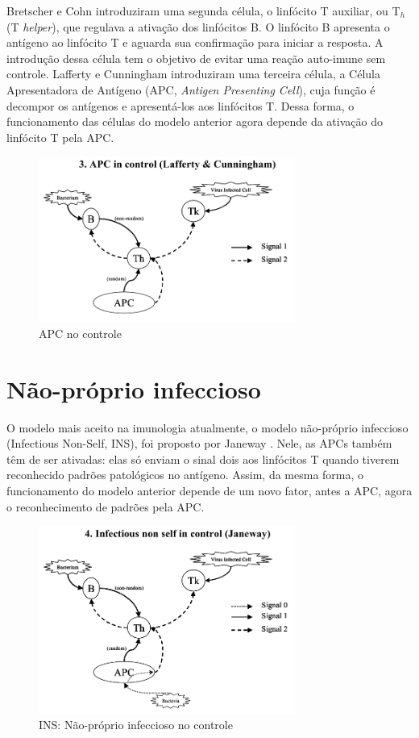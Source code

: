 Bretscher e Cohn introduziram uma segunda célula, o linfócito T auxiliar, ou T$_{h}$ (T \emph{helper}), que regulava a ativação dos linfócitos B. O linfócito B apresenta o antígeno ao linfócito T e aguarda sua confirmação para iniciar a resposta. A introdução dessa célula tem o objetivo de evitar uma reação auto-imune sem controle. Lafferty e Cunningham introduziram uma terceira célula, a Célula Apresentadora de Antígeno (APC, \emph{Antigen Presenting Cell}), cuja função é decompor os antígenos e apresentá-los aos linfócitos T. Dessa forma, o funcionamento das células do modelo anterior agora depende da ativação do linfócito T pela APC.

\begin{figure}[h!]
\centering
\includegraphics[width=0.75\textwidth]{img/signals3-apc.png}
\caption{APC no controle}
\end{figure}

\section{Não-próprio infeccioso}

O modelo mais aceito na imunologia atualmente, o modelo não-próprio infeccioso (Infectious Non-Self, INS), foi proposto por Janeway \cite{Janeway1989}. Nele, as APCs também têm de ser ativadas: elas só enviam o sinal dois aos linfócitos T quando tiverem reconhecido padrões patológicos no antígeno. Assim, da mesma forma, o funcionamento do modelo anterior depende de um novo fator, antes a APC, agora o reconhecimento de padrões pela APC.

\begin{figure}[h!]
\centering
\includegraphics[width=0.75\textwidth]{img/signals4-ins.png}
\caption{INS: Não-próprio infeccioso no controle}
\end{figure}

